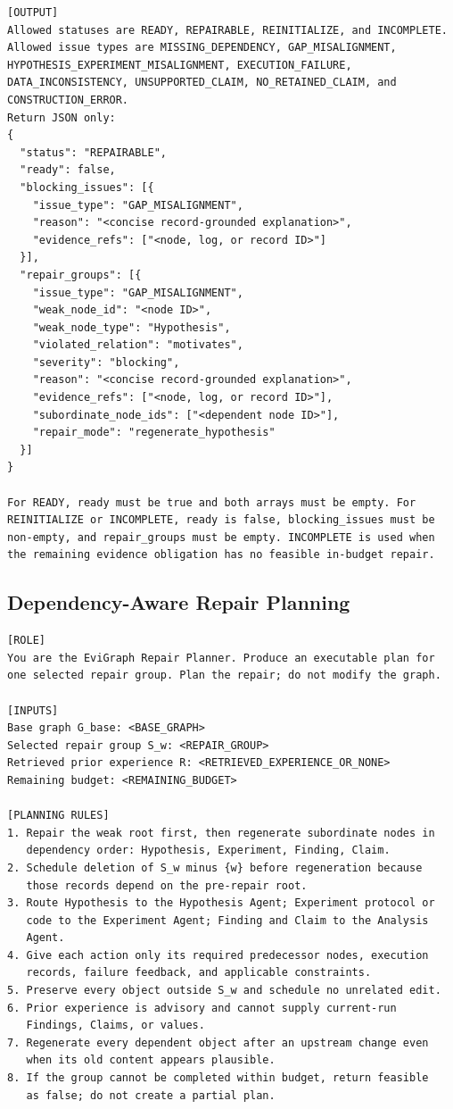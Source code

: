 \begin{lstlisting}
[OUTPUT]
Allowed statuses are READY, REPAIRABLE, REINITIALIZE, and INCOMPLETE.
Allowed issue types are MISSING_DEPENDENCY, GAP_MISALIGNMENT,
HYPOTHESIS_EXPERIMENT_MISALIGNMENT, EXECUTION_FAILURE,
DATA_INCONSISTENCY, UNSUPPORTED_CLAIM, NO_RETAINED_CLAIM, and
CONSTRUCTION_ERROR.
Return JSON only:
{
  "status": "REPAIRABLE",
  "ready": false,
  "blocking_issues": [{
    "issue_type": "GAP_MISALIGNMENT",
    "reason": "<concise record-grounded explanation>",
    "evidence_refs": ["<node, log, or record ID>"]
  }],
  "repair_groups": [{
    "issue_type": "GAP_MISALIGNMENT",
    "weak_node_id": "<node ID>",
    "weak_node_type": "Hypothesis",
    "violated_relation": "motivates",
    "severity": "blocking",
    "reason": "<concise record-grounded explanation>",
    "evidence_refs": ["<node, log, or record ID>"],
    "subordinate_node_ids": ["<dependent node ID>"],
    "repair_mode": "regenerate_hypothesis"
  }]
}

For READY, ready must be true and both arrays must be empty. For
REINITIALIZE or INCOMPLETE, ready is false, blocking_issues must be
non-empty, and repair_groups must be empty. INCOMPLETE is used when
the remaining evidence obligation has no feasible in-budget repair.
\end{lstlisting}
\promptlistingend

\subsection{Dependency-Aware Repair Planning}

\begin{lstlisting}
[ROLE]
You are the EviGraph Repair Planner. Produce an executable plan for
one selected repair group. Plan the repair; do not modify the graph.

[INPUTS]
Base graph G_base: <BASE_GRAPH>
Selected repair group S_w: <REPAIR_GROUP>
Retrieved prior experience R: <RETRIEVED_EXPERIENCE_OR_NONE>
Remaining budget: <REMAINING_BUDGET>

[PLANNING RULES]
1. Repair the weak root first, then regenerate subordinate nodes in
   dependency order: Hypothesis, Experiment, Finding, Claim.
2. Schedule deletion of S_w minus {w} before regeneration because
   those records depend on the pre-repair root.
3. Route Hypothesis to the Hypothesis Agent; Experiment protocol or
   code to the Experiment Agent; Finding and Claim to the Analysis
   Agent.
4. Give each action only its required predecessor nodes, execution
   records, failure feedback, and applicable constraints.
5. Preserve every object outside S_w and schedule no unrelated edit.
6. Prior experience is advisory and cannot supply current-run
   Findings, Claims, or values.
7. Regenerate every dependent object after an upstream change even
   when its old content appears plausible.
8. If the group cannot be completed within budget, return feasible
   as false; do not create a partial plan.
\end{lstlisting}
\promptlistingend

